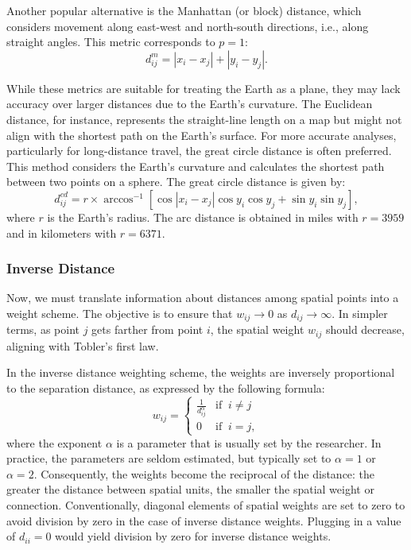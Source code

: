 \documentclass[english,12pt]{book}\usepackage[]{graphicx}\usepackage[]{xcolor}
\begin{document}
Another popular alternative is the Manhattan (or block) distance, which considers movement along east-west and north-south directions, i.e., along straight angles. This metric corresponds to $p = 1$:
\begin{equation*}
   d_{ij}^m = \left|x_i - x_j\right| + \left|y_i - y_j\right|.
\end{equation*}

While these metrics are suitable for treating the Earth as a plane, they may lack accuracy over larger distances due to the Earth's curvature. The Euclidean distance, for instance, represents the straight-line length on a map but might not align with the shortest path on the Earth's surface. For more accurate analyses, particularly for long-distance travel, the great circle distance is often preferred. This method considers the Earth's curvature and calculates the shortest path between two points on a sphere. The great circle distance is given by:
\begin{equation*}
d_{ij}^{cd} = r \times \arccos^{-1}\left[\cos|x_i - x_j| \cos y_i \cos y_j + \sin y_i \sin y_j \right],
\end{equation*}
%
where $r$ is the Earth's radius. The arc distance is obtained in miles with $r = 3959$ and in kilometers with $r = 6371$.

\subsubsection{Inverse Distance}\label{sec:inverse_distance}

Now, we must translate information about distances among spatial points into a weight scheme. The objective is to ensure that $w_{ij} \to 0$ as $d_{ij} \to \infty$. In simpler terms, as point $j$ gets farther from point $i$, the spatial weight $w_{ij}$ should decrease, aligning with Tobler's first law.

In the inverse distance weighting scheme, the weights are inversely proportional to the separation distance, as expressed by the following formula:
\begin{equation*}
  w_{ij} =
  \begin{cases}
  \frac{1}{d_{ij}^{\alpha}} & \mbox{if} \;\;i \neq j \\
  0 & \mbox{if}\;\; i = j,
  \end{cases}
\end{equation*}
%
where the exponent $\alpha$ is a parameter that is usually set by the researcher. In practice, the parameters are seldom estimated, but typically set to $\alpha = 1$ or $\alpha = 2$. Consequently, the weights become the reciprocal of the distance: the greater the distance between spatial units, the smaller the spatial weight or connection. Conventionally, diagonal elements of spatial weights are set to zero to avoid division by zero in the case of inverse distance weights. Plugging in a value of $d_{ii} = 0$ would yield division by zero for inverse distance weights. 
\end{document}

